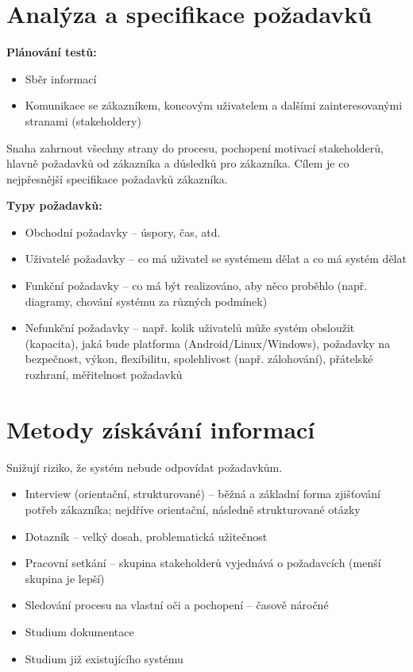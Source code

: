 \documentclass{article}
\begin{document}
\sloppy
\section{Analýza a specifikace požadavků}
\textbf{Plánování testů:}
\begin{itemize}
    \item Sběr informací
    \item Komunikace se zákazníkem, koncovým uživatelem a dalšími zainteresovanými stranami (stakeholdery)
\end{itemize}
Snaha zahrnout všechny strany do procesu, pochopení motivací stakeholderů, hlavně požadavků od zákazníka a důsledků pro zákazníka. Cílem je co nejpřesnější specifikace požadavků zákazníka.

\textbf{Typy požadavků:}
\begin{itemize}
    \item Obchodní požadavky – úspory, čas, atd.
    \item Uživatelé požadavky – co má uživatel se systémem dělat a co má systém dělat
    \item Funkční požadavky – co má být realizováno, aby něco proběhlo (např. diagramy, chování systému za různých podmínek)
    \item Nefunkční požadavky – např. kolik uživatelů může systém obsloužit (kapacita), jaká bude platforma (Android/Linux/Windows), požadavky na bezpečnost, výkon, flexibilitu, spolehlivost (např. zálohování), přátelské rozhraní, měřitelnost požadavků
\end{itemize}

\section{Metody získávání informací}
Snižují riziko, že systém nebude odpovídat požadavkům.

\begin{itemize}
    \item Interview (orientační, strukturované) – běžná a základní forma zjišťování potřeb zákazníka; nejdříve orientační, následně strukturované otázky
    \item Dotazník – velký dosah, problematická užitečnost
    \item Pracovní setkání – skupina stakeholderů vyjednává o požadavcích (menší skupina je lepší)
    \item Sledování procesu na vlastní oči a pochopení – časově náročné
    \item Studium dokumentace
    \item Studium již existujícího systému
\end{itemize}
\end{document}
